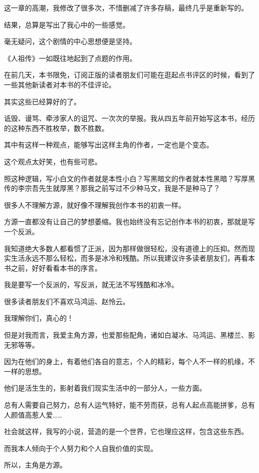 \begin{this_body}
这一章的高潮，我修改了很多次，不惜删减了许多存稿，最终几乎是重新写的。

结果，总算是写出了我心中的一些感觉。

毫无疑问，这个剧情的中心思想便是坚持。

《人祖传》一如既往地起到了点题的作用。

在前几天，本书限免，订阅正版的读者朋友们可能在逛起点书评区的时候，看到了一些其他新读者对本书的不佳评论。

其实这些已经算好的了。

诋毁、谩骂、牵涉家人的诅咒、一次次的举报。我从四五年前开始写这本书，经历的这种东西不胜枚举，数不胜数。

其中有这样一种观点，能够写出这样主角的作者，一定也是个变态。

这个观点太好笑，也有些可悲。

照这种逻辑，写小白文的作者就是本性小白？写黑暗文的作者就本性黑暗？写厚黑传的李宗吾先生就厚黑？那我之前写过不少种马文，我是不是种马了？

很多人不理解方源，就好像不理解我创作本书的初衷一样。

方源一直都没有让自己的梦想萎缩。我也始终没有忘记创作本书的初衷，那就是写一个反派。

我知道绝大多数人都看惯了正派，因为那样做很轻松，没有道德上的压抑。然而现实生活永远不那么轻松，而多是冰冷和残酷。所以我建议许多读者朋友们，再看本书之前，好好看看本书的序言。

我是要写一个反派的，写反派，就无法不写残酷和冰冷。

很多读者朋友们不喜欢马鸿运、赵怜云。

我理解你们，真心的！

但是对我而言，我爱主角方源，也爱那些配角，诸如白凝冰、马鸿运、黑楼兰、影无邪等等。

因为在他们的身上，有着他们各自的意志，个人的精彩，每个人不一样的机缘，不一样的思想。

他们是活生生的，影射着我们现实生活中的一部分人，一些方面。

总有人需要自己努力，总有人运气特好，能不劳而获，总有人起点高能拼爹，总有人颜值高惹人爱……

社会就这样，我写的小说，营造的是一个世界，它也理应这样，包含这些东西。

而我本人倾向于个人努力和个人自我价值的实现。

所以，主角是方源。


\end{this_body}
